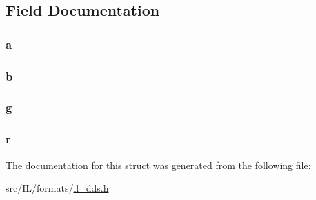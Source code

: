 \subsection{Field Documentation}
\hypertarget{struct_color8888_a3110afaca40282cde44e6764cf21534b}{
\subsubsection[{a}]{ a}}\label{struct_color8888_a3110afaca40282cde44e6764cf21534b}
\hypertarget{struct_color8888_a767438b01504b1c7932519cfe8b34a1b}{
\subsubsection[{b}]{ b}}\label{struct_color8888_a767438b01504b1c7932519cfe8b34a1b}
\hypertarget{struct_color8888_a813a7b494594f710f6e04f086cb60fe7}{
\subsubsection[{g}]{ g}}\label{struct_color8888_a813a7b494594f710f6e04f086cb60fe7}
\hypertarget{struct_color8888_afedb8d54ff10b9cac4be2824f3928524}{
\subsubsection[{r}]{ r}}\label{struct_color8888_afedb8d54ff10b9cac4be2824f3928524}


The documentation for this struct was generated from the following file\-:\begin{DoxyCompactItemize}
\item 
src/\-I\-L/formats/\hyperlink{il__dds_8h}{il\-\_\-dds.\-h}\end{DoxyCompactItemize}
